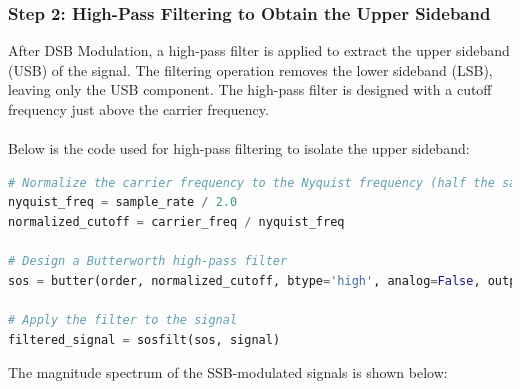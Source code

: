 \documentclass[12pt,a4paper]{article}
\begin{document}
\subsubsection{Step 2: High-Pass Filtering to Obtain the Upper Sideband}
After DSB Modulation, a high-pass filter is applied to extract the upper sideband (USB) of the signal. The filtering operation removes the lower sideband (LSB), leaving only the USB component. The high-pass filter is designed with a cutoff frequency just above the carrier frequency. \\
\\
Below is the code used for high-pass filtering to isolate the upper sideband:
\begin{lstlisting}[language=Python, caption=High-Pass Filtering Code]
# Normalize the carrier frequency to the Nyquist frequency (half the sample rate)
nyquist_freq = sample_rate / 2.0
normalized_cutoff = carrier_freq / nyquist_freq

# Design a Butterworth high-pass filter
sos = butter(order, normalized_cutoff, btype='high', analog=False, output='sos')

# Apply the filter to the signal
filtered_signal = sosfilt(sos, signal)
\end{lstlisting}
The magnitude spectrum of the SSB-modulated signals is shown below:
\end{document}
